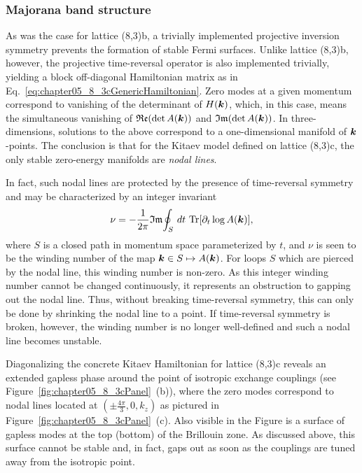 \subsubsection{Majorana band structure}
%
%
As was the case for lattice (8,3)b, a trivially implemented projective inversion symmetry prevents the formation of stable Fermi surfaces.
Unlike lattice (8,3)b, however, the projective time-reversal operator is also implemented trivially, yielding a block off-diagonal Hamiltonian matrix as in Eq.~\eqref{eq:chapter05_8_3cGenericHamiltonian}.
Zero modes at a given momentum correspond to vanishing of the determinant of $H(\bm{k})$, which, in this case, means the simultaneous vanishing of $\mathfrak{Re}{(\det{A(\bm{k})})}$ and $\mathfrak{Im}{(\det{A(\bm{k})})}$.
In three-dimensions, solutions to the above correspond to a one-dimensional manifold of $\bm{k}$-points.
The conclusion is that for the Kitaev model defined on lattice (8,3)c, the only stable zero-energy manifolds are \textit{nodal lines}.

In fact, such nodal lines are protected by the presence of time-reversal symmetry and may be characterized by an integer invariant~\cite{BurkovPRB2011,ZhaoPRL2013,MatsuuraNJP2013}
%
\begin{equation}
	\nu = -\frac{1}{2\pi} \mathfrak{Im}{\oint_S}~dt~\text{Tr}{[\partial_t \log A(\bm{k})]},
\end{equation}
%
where $S$ is a closed path in momentum space parameterized by $t$, and $\nu$ is seen to be the winding number of the map $\bm{k} \in S \mapsto A(\bm{k})$.
For loops $S$ which are pierced by the nodal line, this winding number is non-zero.
As this integer winding number cannot be changed continuously, it represents an obstruction to gapping out the nodal line.
Thus, without breaking time-reversal symmetry, this can only be done by shrinking the nodal line to a point.
If time-reversal symmetry is broken, however, the winding number is no longer well-defined and such a nodal line becomes unstable.

Diagonalizing the concrete Kitaev Hamiltonian for lattice (8,3)c reveals an extended gapless phase around the point of isotropic exchange couplings (see Figure~\ref{fig:chapter05_8_3cPanel}~(b)), where the zero modes correspond to nodal lines located at $(\pm\frac{4\pi}{3}, 0, k_z)$ as pictured in Figure~\ref{fig:chapter05_8_3cPanel}~(c).
Also visible in the Figure is a surface of gapless modes at the top (bottom) of the Brillouin zone.
As discussed above, this surface cannot be stable and, in fact, gaps out as soon as the couplings are tuned away from the isotropic point.

